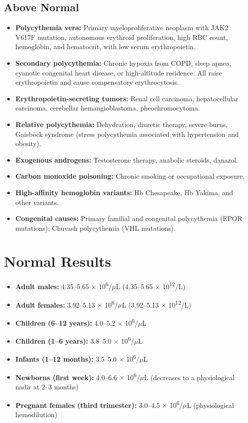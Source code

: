 \subsection*{Above Normal}
\begin{itemize}
  \item \textbf{Polycythemia vera:} Primary myeloproliferative neoplasm with JAK2 V617F mutation, autonomous erythroid proliferation, high RBC count, hemoglobin, and hematocrit, with low serum erythropoietin.
  \item \textbf{Secondary polycythemia:} Chronic hypoxia from COPD, sleep apnea, cyanotic congenital heart disease, or high-altitude residence. All raise erythropoietin and cause compensatory erythrocytosis.
  \item \textbf{Erythropoietin-secreting tumors:} Renal cell carcinoma, hepatocellular carcinoma, cerebellar hemangioblastoma, pheochromocytoma.
  \item \textbf{Relative polycythemia:} Dehydration, diuretic therapy, severe burns, Gaisb\"{o}ck syndrome (stress polycythemia associated with hypertension and obesity).
  \item \textbf{Exogenous androgens:} Testosterone therapy, anabolic steroids, danazol.
  \item \textbf{Carbon monoxide poisoning:} Chronic smoking or occupational exposure.
  \item \textbf{High-affinity hemoglobin variants:} Hb Chesapeake, Hb Yakima, and other variants.
  \item \textbf{Congenital causes:} Primary familial and congenital polycythemia (EPOR mutations); Chuvash polycythemia (VHL mutations).
\end{itemize}

\section*{Normal Results}
\begin{itemize}
  \item \textbf{Adult males:} 4.35--5.65 $\times$ 10\textsuperscript{6}/$\mu$L (4.35--5.65 $\times$ 10\textsuperscript{12}/L) \cite{fischbach2023manual}
  \item \textbf{Adult females:} 3.92--5.13 $\times$ 10\textsuperscript{6}/$\mu$L (3.92--5.13 $\times$ 10\textsuperscript{12}/L)
  \item \textbf{Children (6--12 years):} 4.0--5.2 $\times$ 10\textsuperscript{6}/$\mu$L
  \item \textbf{Children (1--6 years):} 3.8--5.0 $\times$ 10\textsuperscript{6}/$\mu$L
  \item \textbf{Infants (1--12 months):} 3.5--5.0 $\times$ 10\textsuperscript{6}/$\mu$L
  \item \textbf{Newborns (first week):} 4.0--6.6 $\times$ 10\textsuperscript{6}/$\mu$L (decreases to a physiological nadir at 2--3 months)
  \item \textbf{Pregnant females (third trimester):} 3.0--4.5 $\times$ 10\textsuperscript{6}/$\mu$L (physiological hemodilution)
\end{itemize}

